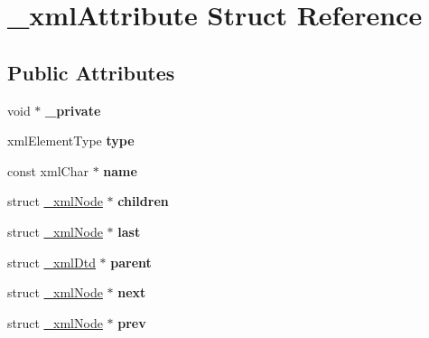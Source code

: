 \hypertarget{struct__xml_attribute}{}\section{\+\_\+xml\+Attribute Struct Reference}
\label{struct__xml_attribute}
\subsection*{Public Attributes}
\begin{DoxyCompactItemize}
\item 
\mbox{\label{struct__xml_attribute_a3db7f8ae253ee907711d1377ef688bc0}} 
void $\ast$ {\bfseries \+\_\+private}
\item 
\mbox{\label{struct__xml_attribute_af3ca1a0e47ae810fbb710a8f07ea70cc}} 
xml\+Element\+Type {\bfseries type}
\item 
\mbox{\label{struct__xml_attribute_a35a0be8bbf112f3409ab47a45f2a33af}} 
const xml\+Char $\ast$ {\bfseries name}
\item 
\mbox{\label{struct__xml_attribute_ab523ec1bd56b4f5c1867890ec6098e8f}} 
struct \mbox{\hyperlink{struct__xml_node}{\+\_\+xml\+Node}} $\ast$ {\bfseries children}
\item 
\mbox{\label{struct__xml_attribute_ae3ef54ca4afda8aea53163857d2685bf}} 
struct \mbox{\hyperlink{struct__xml_node}{\+\_\+xml\+Node}} $\ast$ {\bfseries last}
\item 
\mbox{\label{struct__xml_attribute_acf4b2fe0cbc2f1d4cbc839f23231fd24}} 
struct \mbox{\hyperlink{struct__xml_dtd}{\+\_\+xml\+Dtd}} $\ast$ {\bfseries parent}
\item 
\mbox{\label{struct__xml_attribute_aaf451d7856b880bbf981889eae9c2828}} 
struct \mbox{\hyperlink{struct__xml_node}{\+\_\+xml\+Node}} $\ast$ {\bfseries next}
\item 
\mbox{\label{struct__xml_attribute_a7c8303adaaafa913f726f7fd557fc480}} 
struct \mbox{\hyperlink{struct__xml_node}{\+\_\+xml\+Node}} $\ast$ {\bfseries prev}

\end{DoxyCompactItemize}
